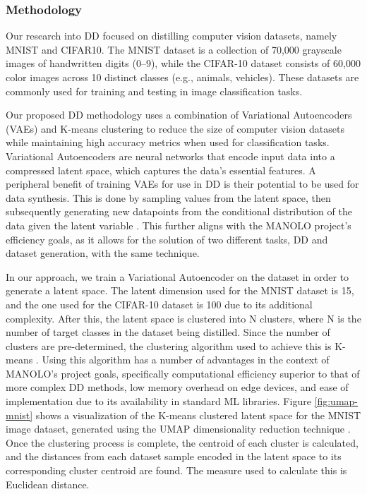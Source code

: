 \subsubsection{Methodology}

Our research into DD focused on distilling computer vision datasets, namely MNIST and CIFAR10. The MNIST dataset is a collection of 70,000 grayscale images of handwritten digits (0–9), while the CIFAR-10 dataset consists of 60,000 color images across 10 distinct classes (e.g., animals, vehicles). These datasets are commonly used for training and testing in image classification tasks.

Our proposed DD methodology uses a combination of Variational Autoencoders (VAEs) and K-means clustering to reduce the size of computer vision datasets while maintaining high accuracy metrics when used for classification tasks. Variational Autoencoders are neural networks that encode input data into a compressed latent space, which captures the data's essential features. A peripheral benefit of training VAEs for use in DD is their potential to  be used for data synthesis. This is done by sampling values from the latent space, then subsequently generating new datapoints from the conditional distribution of the data given the latent variable \cite{8285168}. This further aligns with the MANOLO project's efficiency goals, as it allows for the solution of two different tasks, DD and dataset generation, with the same technique.

In our approach, we train a Variational Autoencoder on the dataset in order to generate a latent space. The latent dimension used for the MNIST dataset is 15, and the one used for the CIFAR-10 dataset is 100 due to its additional complexity. After this, the latent space is clustered into N clusters, where N is the number of target classes in the dataset being distilled. Since the number of clusters are pre-determined, the clustering algorithm used to achieve this is K-means \cite{hartigan1979algorithm}. Using this algorithm has a number of advantages in the context of MANOLO's project goals, specifically computational efficiency superior to that of more complex DD methods, low memory overhead on edge devices, and ease of implementation due to its availability in standard ML libraries. Figure \ref{fig:umap-mnist} shows a visualization of the K-means clustered latent space for the MNIST image dataset, generated using the UMAP dimensionality reduction technique \cite{mcinnes2018umap}. Once the clustering process is complete, the centroid of each cluster is calculated, and the distances from each dataset sample encoded in the latent space to its corresponding cluster centroid are found. The measure used to calculate this is Euclidean distance. 

